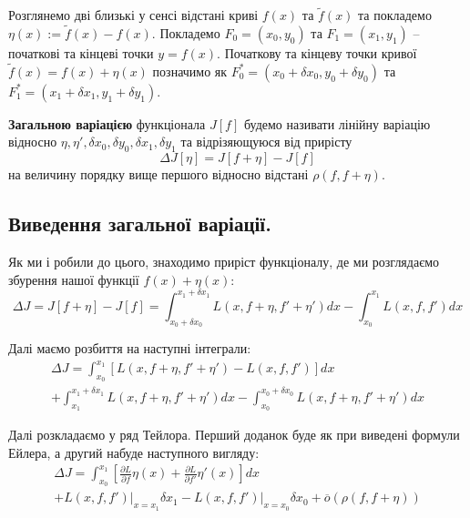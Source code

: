 \documentclass[14pt]{extarticle}
\newcommand{\<}{\langle}
\renewcommand{\>}{\rangle}
\theoremstyle{mystyle}{\newtheorem{definition}{Definition}[section]}
\theoremstyle{mystyle}{\newtheorem{proposition}[definition]{Proposition}}
\theoremstyle{mystyle}{\newtheorem{theorem}[definition]{Theorem}}
\theoremstyle{mystyle}{\newtheorem{lemma}[definition]{Lemma}}
\theoremstyle{mystyle}{\newtheorem{corollary}[definition]{Corollary}}
\theoremstyle{mystyle}{\newtheorem*{remark}{Remark}}
\theoremstyle{mystyle}{\newtheorem*{remarks}{Remarks}}
\theoremstyle{mystyle}{\newtheorem*{example}{Example}}
\theoremstyle{mystyle}{\newtheorem*{examples}{Examples}}
\theoremstyle{definition}{\newtheorem*{exercise}{Exercise}}
\theoremstyle{cstyle}{\newtheorem*{cthm}{}}
\theoremstyle{warn}
\begin{document}
Розглянемо дві близькі у сенсі відстані криві $f(x)$ та $\widetilde{f}(x)$ та покладемо $\eta(x) := \widetilde{f}(x) - f(x)$. Покладемо $F_0=(x_0,y_0)$ та $F_1=(x_1,y_1)$ -- початкові та кінцеві точки $y=f(x)$. 
Початкову та кінцеву точки кривої $\widetilde{f}(x)=f(x)+\eta(x)$ позначимо як $F_0^*=(x_0+\delta x_0,y_0+\delta y_0)$ та $F_1^*=(x_1+\delta x_1,y_1+\delta y_1)$. 

\begin{definition}
    \textbf{Загальною варіацією} функціонала $J[f]$ будемо називати лінійну варіацію відносно $\eta,\eta',\delta x_0,\delta y_0,\delta x_1, \delta y_1$ та відрізяющуюся від прирісту 
    \begin{equation}
        \Delta J[\eta] = J[f+\eta] - J[f]
    \end{equation}
    на величину порядку вище першого відносно відстані $\rho(f,f+\eta)$.
\end{definition}

\subsection{Виведення загальної варіації.}

Як ми і робили до цього, знаходимо приріст функціоналу, де ми розглядаємо збурення нашої функції $f(x)+\eta(x)$:
\begin{equation}
    \Delta J = J[f+\eta] - J[f] = \int_{x_0+\delta x_0}^{x_1+\delta x_1}L(x,f+\eta,f'+\eta')dx - \int_{x_0}^{x_1}L(x,f,f')dx
\end{equation}

Далі маємо розбиття на наступні інтеграли:
\begin{gather}
    \Delta J = \int_{x_0}^{x_1}\left[L(x,f+\eta,f'+\eta')-L(x,f,f')\right]dx \nonumber \\ + \int_{x_1}^{x_1+\delta x_1}L(x,f+\eta,f'+\eta')dx - \int_{x_0}^{x_0+\delta x_0}L(x,f+\eta,f'+\eta')dx
\end{gather}

Далі розкладаємо у ряд Тейлора. Перший доданок буде як при виведені формули Ейлера, а другий набуде наступного вигляду:
\begin{gather}
    \Delta J = \int_{x_0}^{x_1}\left[\frac{\partial L}{\partial f}\eta(x)+\frac{\partial L}{\partial f'}\eta'(x)\right]dx \nonumber \\
    + L(x,f,f')\Big|_{x=x_1}\delta x_1 - L(x,f,f')\Big|_{x=x_0}\delta x_0 + \overline{o}(\rho(f,f+\eta))
\end{gather}
\end{document}
